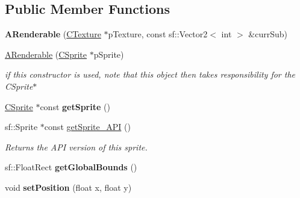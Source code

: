 \subsection*{Public Member Functions}
\begin{DoxyCompactItemize}
\item 
\hypertarget{classARenderable_a945fecfa1012fc94f186b8814f225ae8}{{\bfseries A\-Renderable} (\hyperlink{classCTexture}{C\-Texture} $\ast$p\-Texture, const sf\-::\-Vector2$<$ int $>$ \&curr\-Sub)}\label{classARenderable_a945fecfa1012fc94f186b8814f225ae8}

\item 
\hypertarget{classARenderable_a3d575592900ff1796452f35e7c618e6d}{\hyperlink{classARenderable_a3d575592900ff1796452f35e7c618e6d}{A\-Renderable} (\hyperlink{classCSprite}{C\-Sprite} $\ast$p\-Sprite)}\label{classARenderable_a3d575592900ff1796452f35e7c618e6d}

\begin{DoxyCompactList}\small\item\em if this constructor is used, note that this object then takes responsibility for the C\-Sprite$\ast$ \end{DoxyCompactList}\item 
\hypertarget{classARenderable_a4dc17477a94447c2ece7c418a47e3860}{\hyperlink{classCSprite}{C\-Sprite} $\ast$const {\bfseries get\-Sprite} ()}\label{classARenderable_a4dc17477a94447c2ece7c418a47e3860}

\item 
\hypertarget{classARenderable_a2cbb5617817d6697fd817f87bceebf77}{sf\-::\-Sprite $\ast$const \hyperlink{classARenderable_a2cbb5617817d6697fd817f87bceebf77}{get\-Sprite\-\_\-\-A\-P\-I} ()}\label{classARenderable_a2cbb5617817d6697fd817f87bceebf77}

\begin{DoxyCompactList}\small\item\em Returns the A\-P\-I version of this sprite. \end{DoxyCompactList}\item 
\hypertarget{classARenderable_a77d3d8b9f8d7f0e8b860abba2f6c53c9}{sf\-::\-Float\-Rect {\bfseries get\-Global\-Bounds} ()}\label{classARenderable_a77d3d8b9f8d7f0e8b860abba2f6c53c9}

\item 
\hypertarget{classARenderable_a1d0db7e6ba2e9bf6d8accb4164531b46}{void {\bfseries set\-Position} (float x, float y)}\label{classARenderable_a1d0db7e6ba2e9bf6d8accb4164531b46}

\end{DoxyCompactItemize}
